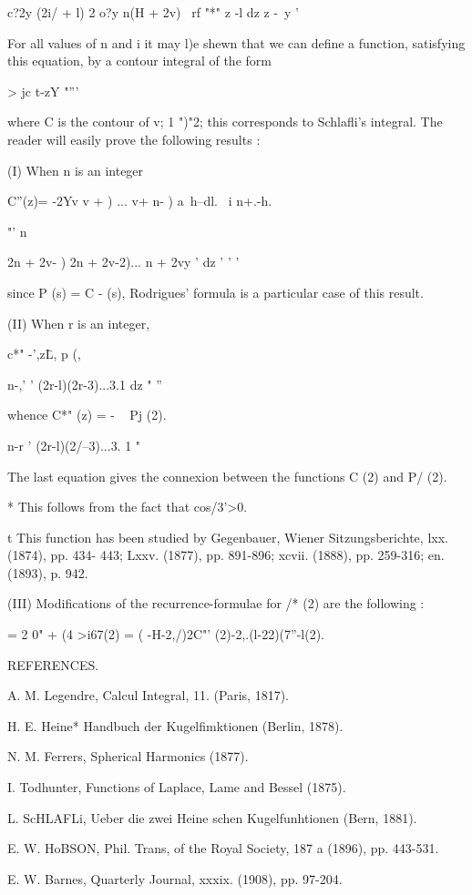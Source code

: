 {{{c?2y (2i/ + l) 2 o?y n(H + 2v) \ rf "*" z -l dz z -\ y '

For all values of n and i it may l)e shewn that we can define a
function, satisfying this equation, by a contour integral of the form

  > jc t-zY "'''

where C is the contour of v; 1 ")"2; this corresponds to Schlafli's
integral. The reader will easily prove the following results :

(I) When n is an integer

C''(z)= -2Yv v + ) ... v+ n- ) a\, h--dl. \ i n+.-h.

"' n\ \ {2n + 2v- ) 2n + 2v-2)... n + 2vy ' dz ' ' '

since P (s) = C - (s), Rodrigues' formula is a particular case of this
result.

(II) When r is an integer,

c*" -',z\= L, p (,\

n-,' ' (2r-l)(2r-3)...3.1 dz " ''

whence C*" (z) = - ~ Pj (2).

n-r ' (2r-l)(2/--3)...3. 1 "

The last equation gives the connexion between the functions C (2) and
P/ (2).

* This follows from the fact that cos/3'>0.

t This function has been studied by Gegenbauer, Wiener
Sitzungsberichte, lxx. (1874), pp. 434- 443; Lxxv. (1877), pp.
891-896; xcvii. (1888), pp. 259-316; en. (1893), p. 942.

%
%

(III) Modifications of the recurrence-formulae for /* (2) are the
following :

   = 2 0" + (4 >i67(2) = ( -H-2,/)2C"' (2)-2,.(l-22)(7''-l(2).

REFERENCES.

A. M. Legendre, Calcul Integral, 11. (Paris, 1817).

H. E. Heine* Handbuch der Kugelfimktionen (Berlin, 1878).

N. M. Ferrers, Spherical Harmonics (1877).

I. Todhunter, Functions of Laplace, Lame and Bessel (1875).

L. ScHLAFLi, Ueber die zwei Heine schen Kugelfunhtionen (Bern, 1881).

E. W. HoBSON, Phil. Trans, of the Royal Society, 187 a (1896), pp.
443-531.

E. W. Barnes, Quarterly Journal, xxxix. (1908), pp. 97-204.

}}}}
